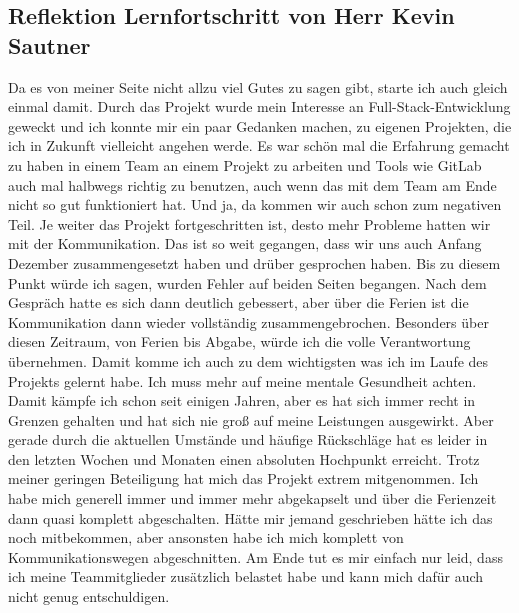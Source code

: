 \subsection{Reflektion Lernfortschritt von Herr Kevin Sautner}
Da es von meiner Seite nicht allzu viel Gutes zu sagen gibt, starte ich auch gleich einmal damit. 
Durch das Projekt wurde mein Interesse an Full-Stack-Entwicklung geweckt und ich konnte mir ein paar Gedanken machen, zu eigenen Projekten, die ich in Zukunft vielleicht angehen werde. 
Es war schön mal die Erfahrung gemacht zu haben in einem Team an einem Projekt zu arbeiten und Tools wie GitLab auch mal halbwegs richtig zu benutzen, auch wenn das mit dem Team am Ende nicht so gut funktioniert hat.
Und ja, da kommen wir auch schon zum negativen Teil. \newline
Je weiter das Projekt fortgeschritten ist, desto mehr Probleme hatten wir mit der Kommunikation. Das ist so weit gegangen, dass wir uns auch Anfang Dezember zusammengesetzt haben und drüber gesprochen haben. 
Bis zu diesem Punkt würde ich sagen, wurden Fehler auf beiden Seiten begangen. 
Nach dem Gespräch hatte es sich dann deutlich gebessert, aber über die Ferien ist die Kommunikation dann wieder vollständig zusammengebrochen.
Besonders über diesen Zeitraum, von Ferien bis Abgabe, würde ich die volle Verantwortung übernehmen. 
Damit komme ich auch zu dem wichtigsten was ich im Laufe des Projekts gelernt habe. \newline
Ich muss mehr auf meine mentale Gesundheit achten. Damit kämpfe ich schon seit einigen Jahren, aber es hat sich immer recht in Grenzen gehalten und hat sich nie groß auf meine Leistungen ausgewirkt. 
Aber gerade durch die aktuellen Umstände und häufige Rückschläge hat es leider in den letzten Wochen und Monaten einen absoluten Hochpunkt erreicht. 
Trotz meiner geringen Beteiligung hat mich das Projekt extrem mitgenommen. 
Ich habe mich generell immer und immer mehr abgekapselt und über die Ferienzeit dann quasi komplett abgeschalten. 
Hätte mir jemand geschrieben hätte ich das noch mitbekommen, aber ansonsten habe ich mich komplett von Kommunikationswegen abgeschnitten. \newline
Am Ende tut es mir einfach nur leid, dass ich meine Teammitglieder zusätzlich belastet habe und kann mich dafür auch nicht genug entschuldigen.
